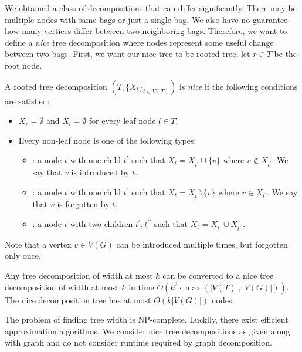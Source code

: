 We obtained a class of decompositions that can differ significantly.
There may be multiple nodes with same bags or just a single bag.
We also have no guarantee how many vertices differ between two neighboring bags.
Therefore, we want to define a \emph{nice} tree decomposition where nodes
represent some useful change between two bags.
First, we want our nice tree to be rooted tree,
let \( r \in T \) be the root node.
%
\begin{definition}
	A rooted tree decomposition
	\( (T, {\{X_t\}}_{t \in V ( T )}) \)
	is \emph{nice} if the following conditions are satisfied:
	\begin{itemize}
		\item \( X_r = \emptyset \) and \( X_l = \emptyset \) for every leaf node \( l \in T \).
		\item Every non-leaf node is one of the following types:
		      \begin{itemize}
			      \item \IntroduceVertexNode{}: a node \( t \) with one child \( t^\prime \)
			            such that \( X_t = X_{t^\prime} \cup \{v\} \) where \( v \not\in X_{t^\prime} \).
			            We say that \( v \) is introduced by \( t \).
			      \item \ForgetVertexNode{}: a node \( t \) with one child \( t^\prime \)
			            such that \( X_t = X_{t^\prime} \setminus \{v\} \) where \( v \in X_{t^\prime} \).
			            We say that \( v \) is forgotten by \( t \).
			      \item \JoinNode: a node \( t \) with two children \( t^\prime, t^{\prime\prime} \)
			            such that \( X_t = X_{t^\prime} \cup X_{t^{\prime\prime}} \).
		      \end{itemize}
	\end{itemize}
\end{definition}
%
Note that a vertex \( v \in V(G) \) can be introduced multiple times,
but forgotten only once.

\begin{lemma}
	Any tree decomposition of width at most \( k \) can be converted to
	a nice tree decomposition of width at most \( k \)
	in time \( O(k^2 \cdot \max(|V(T)|, |V(G)|)) \).
	The nice decomposition tree has at most \( O(k|V(G)|) \) nodes.
\end{lemma}

The problem of finding tree width is NP-complete.
Luckily, there exist efficient approximation algorithms.
We consider nice tree decompositions as given along with graph
and do not consider runtime required by graph decomposition.

